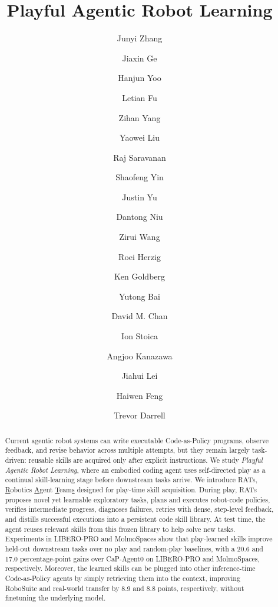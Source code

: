 \documentclass{llmxive}
\title{Playful Agentic Robot Learning}
\author{Junyi Zhang \and Jiaxin Ge \and Hanjun Yoo \and Letian Fu \and Zihan Yang \and Yaowei Liu \and Raj Saravanan \and Shaofeng Yin \and Justin Yu \and Dantong Niu \and Zirui Wang \and Roei Herzig \and Ken Goldberg \and Yutong Bai \and David M. Chan \and Ion Stoica \and Angjoo Kanazawa \and Jiahui Lei \and Haiwen Feng \and Trevor Darrell}
\providecommand{\VLA}{Vision-Language Action}
\providecommand{\VLM}{Vision-Language Model}
\providecommand{\LLM}{Large Language Model}
\providecommand{\CaPX}{CaP-X}
\providecommand{\CaPAgent}{CaP-Agent0}
\begin{document}
\maketitle
\begin{abstract}
Current agentic robot systems can write executable Code-as-Policy programs, observe feedback, and revise behavior across multiple attempts, but they remain largely task-driven: reusable skills are acquired only after explicit instructions. We study \emph{Playful Agentic Robot Learning}, where an embodied coding agent uses self-directed play as a continual skill-learning stage before downstream tasks arrive. We introduce \textsc{RATs}, \underline{R}obotics \underline{A}gent \underline{T}eam\underline{s} designed for play-time skill acquisition. During play, \textsc{RATs} proposes novel yet learnable exploratory tasks, plans and executes robot-code policies, verifies intermediate progress, diagnoses failures, retries with dense, step-level feedback, and distills successful executions into a persistent code skill library. 
At test time, the agent reuses relevant skills from this frozen library to help solve new tasks.
Experiments in LIBERO-PRO and MolmoSpaces show that play-learned skills improve held-out downstream tasks over no play and random-play baselines, with a 20.6 and 17.0 percentage-point gains over CaP-Agent0 on LIBERO-PRO and MolmoSpaces, respectively. Moreover, the learned skills can be plugged into other inference-time Code-as-Policy agents by simply retrieving them into the context, improving RoboSuite and real-world transfer by 8.9 and 8.8 points, respectively, without finetuning the underlying model.
\end{abstract}
\renewcommand{\VLA}{Vision-Language Action}
\renewcommand{\VLM}{Vision-Language Model}
\renewcommand{\LLM}{Large Language Model}
\renewcommand{\CaPX}{CaP-X}
\renewcommand{\CaPAgent}{CaP-Agent0}
\end{document}
